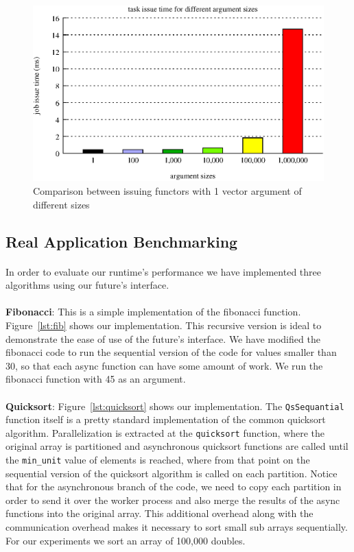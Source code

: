 \begin{figure}[!ht]
\includegraphics[width=0.7\columnwidth]{figures/job_issue_time_different_argsizes}
\caption{Comparison between issuing functors with 1 vector argument of different sizes}
\label{fig:job_issue_time_different_argsizes}
\end{figure}

\subsection{Real Application Benchmarking}
\label{sect:real_app}
\paragraph{}
	In order to evaluate our runtime's performance we have implemented three algorithms using our future's interface.

\paragraph{}
	\textbf{Fibonacci}:  This is a simple implementation of the fibonacci function.  Figure~\ref{lst:fib} shows 
our implementation.  This recursive version is ideal to demonstrate the ease of use of the future's interface.
We have modified the fibonacci code to run the sequential version of the code for values smaller than  30, so that
each async function can have some amount of work.  We run the fibonacci function with 45 as an argument.  

\paragraph{}
	\textbf{Quicksort}:  Figure~\ref{lst:quicksort} shows our implementation.  The \texttt{QsSequantial} 
function itself is a pretty standard
implementation of the common quicksort algorithm.  Parallelization is extracted at the \texttt{quicksort} function, where the 
original array is partitioned and asynchronous quicksort functions are called until the \texttt{min\_unit} value of elements
is reached, where from that point on the sequential version of the quicksort algorithm is called on each partition.
Notice that for the asynchronous branch of the code, we need to copy each partition in order to send it over the worker 
process and also merge the results of the async functions into the original array.  This additional overhead along with 
the communication overhead makes it necessary to sort small sub arrays sequentially.  For our experiments we sort an 
array of 100,000 doubles. 


